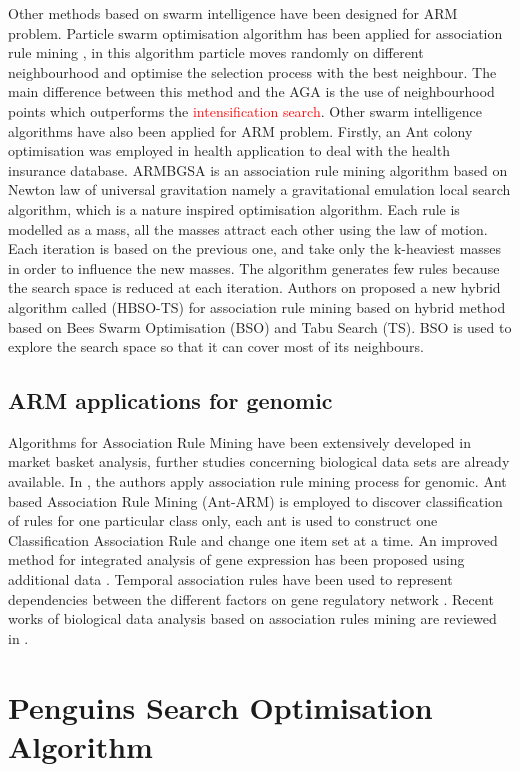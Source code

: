 \documentclass[preprint,12pt]{elsarticle}
\begin{document}
Other methods based on swarm intelligence have been designed for ARM problem. 
Particle swarm optimisation algorithm has been applied for association rule mining \cite{12}, 
in this algorithm particle moves randomly on different neighbourhood and optimise the selection process with the best neighbour. 
The main difference between this method and the AGA is the use of neighbourhood points which outperforms the \textcolor{red} {intensification search}. 
Other swarm intelligence algorithms have also been applied for ARM problem. Firstly, an Ant colony optimisation \cite{20} was employed in health application 
to deal with the health insurance database. ARMBGSA \cite{21} is an association rule mining algorithm based on Newton law of universal gravitation namely 
a gravitational emulation local search algorithm, which is a nature inspired optimisation algorithm. Each rule is modelled as a mass, all the masses attract each other using the law of motion. Each iteration is based on the 
previous one, and take only the k-heaviest masses in order to influence the new masses. The algorithm generates few rules because 
the search space is reduced at each iteration. 
Authors on \cite{22} proposed a new hybrid algorithm called (HBSO-TS) for association rule mining based on hybrid method based on 
Bees Swarm Optimisation (BSO) and Tabu Search (TS). BSO is used to explore the search space so that it can cover most of its neighbours.
 
\subsection{ARM applications for genomic}
Algorithms for Association Rule Mining have been extensively developed in market basket analysis, further studies concerning  biological data sets are already available.
 In \cite{23}, the authors apply association rule mining process for genomic. 
 Ant based Association Rule Mining (Ant-ARM) is employed to discover classification of rules for one particular class only, each ant is used to construct one  Classification Association Rule and change one item set at a time. An improved method for integrated analysis of gene expression has been 
 proposed using additional data \cite{24}. Temporal association rules have been used to represent dependencies between the different factors 
 on gene regulatory network \cite{25}. Recent works of biological data analysis based on association rules mining are reviewed in \cite{26}.

\section{Penguins Search Optimisation Algorithm }
\end{document}
